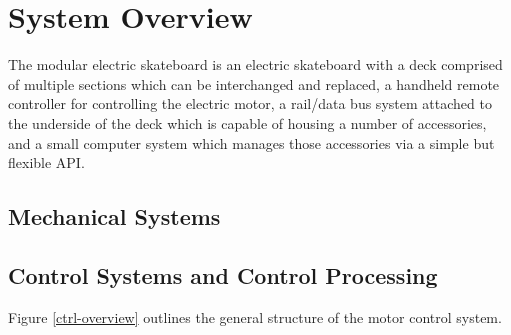 \documentclass[letterpaper,12pt]{article}
\begin{document}
\section{System Overview} 
The modular electric skateboard is an electric skateboard with a deck comprised of multiple sections which can be interchanged and replaced, a handheld remote controller for controlling the electric motor, a rail/data bus system attached to the underside of the deck which is capable of housing a number of accessories, and a small computer system which manages those accessories via a simple but flexible API.

\subsection{Mechanical Systems}
\subsection{Control Systems and Control Processing}
Figure \ref{ctrl-overview} outlines the general structure of the motor control system.
\end{document}
